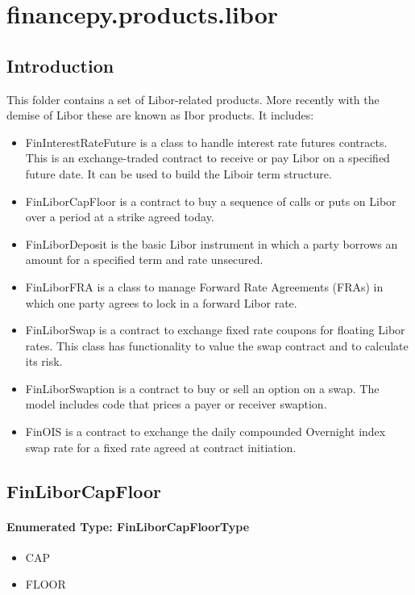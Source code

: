 \documentclass[twoside,11pt]{book}
\begin{document}
\chapter{financepy.products.libor}
\section{Introduction}

This folder contains a set of Libor-related products. More recently with the demise of Libor these are known as Ibor products. It includes:

\begin{itemize}
\item{ FinInterestRateFuture is a class to handle interest rate futures contracts. This is an exchange-traded contract to receive or pay Libor on a specified future date. It can be used to build the Liboir term structure. 
}
\item{ FinLiborCapFloor is a contract to buy a sequence of calls or puts on Libor over a period at a strike agreed today.
}
\item{ FinLiborDeposit is the basic Libor instrument in which a party borrows an amount for a specified term and rate unsecured.
}
\item{ FinLiborFRA is a class to manage Forward Rate Agreements (FRAs) in which one party agrees to lock in a forward Libor rate.
}
\item{ FinLiborSwap is a contract to exchange fixed rate coupons for floating Libor rates. This class has functionality to value the swap contract and to calculate its risk.
}
\item{ FinLiborSwaption is a contract to buy or sell an option on a swap. The model includes code that prices a payer or receiver swaption.
}
\item{ FinOIS is a contract to exchange the daily compounded Overnight index swap rate for a fixed rate agreed at contract initiation.
}
\end{itemize}
\newpage
\section{FinLiborCapFloor}

\subsubsection{Enumerated Type: FinLiborCapFloorType}
\begin{itemize}
\item{CAP}
\item{FLOOR}
\end{itemize}
\end{document}
